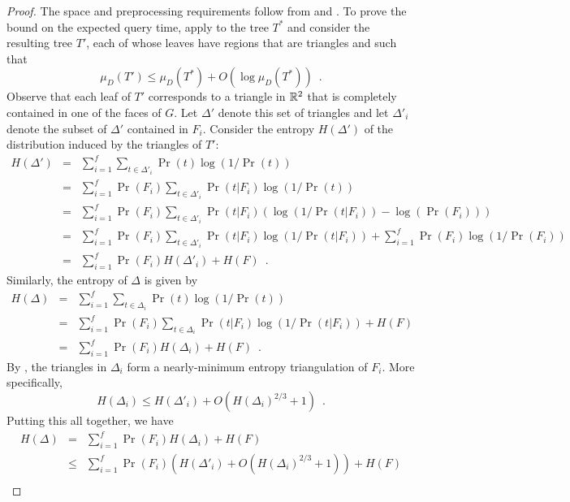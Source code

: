 \documentclass[lotsofwhite]{patmorin}
\begin{document}
\begin{proof}
The space and preprocessing requirements follow from
 and .
To prove the bound on the expected query time, apply
 to the tree $T^*$ and consider the resulting tree
$T'$, each of whose leaves have regions that are triangles and such
that
\[
     \mu_D(T') \le \mu_D(T^*) + O(\log \mu_D(T^*)) \enspace .
\]
Observe that each leaf of $T'$ corresponds to a triangle in $\mathbb{R}^2$
that is completely contained in one of the faces of $G$.  Let
$\Delta'$ denote this set of triangles and let $\Delta'_i$ denote the
subset of $\Delta'$ contained in $F_i$.
Consider the entropy $H(\Delta')$ of the distribution induced by the
triangles of $T'$:
\begin{eqnarray*}
   H(\Delta') 
     & = & \sum_{i=1}^f \sum_{t\in \Delta'_i}\Pr(t)\log(1/\Pr(t)) \\
     & = & \sum_{i=1}^f \Pr(F_i)\sum_{t\in \Delta'_i}
            \Pr(t|F_i)\log(1/\Pr(t)) \\
     & = & \sum_{i=1}^f \Pr(F_i)\sum_{t\in \Delta'_i}
            \Pr(t|F_i)
            \left(
              \log(1/\Pr(t|F_i))-\log(\Pr(F_i))
            \right) \\
     & = & \sum_{i=1}^f \Pr(F_i)\sum_{t\in \Delta'_i}
            \Pr(t|F_i)\log(1/\Pr(t|F_i)) 
          +
      \sum_{i=1}^f \Pr(F_i) \log(1/\Pr(F_i)) \\
     & = & \sum_{i=1}^f \Pr(F_i) H(\Delta'_i) + H(F) \enspace .
\end{eqnarray*}
Similarly, the entropy of $\Delta$ is given by 
\begin{eqnarray*}
   H(\Delta) 
     & = & \sum_{i=1}^f \sum_{t\in \Delta_i}\Pr(t)\log(1/\Pr(t)) \\
     & = & \sum_{i=1}^f \Pr(F_i)\sum_{t\in \Delta_i}
            \Pr(t|F_i)\log(1/\Pr(t|F_i)) 
          + H(F) \\
     & = & \sum_{i=1}^f \Pr(F_i) H(\Delta_i) + H(F) \enspace .
\end{eqnarray*}
By , the triangles in $\Delta_i$ form a
nearly-minimum entropy triangulation of $F_i$.  More specifically, 
\[  
   H(\Delta_i) \le H(\Delta'_i) + O(H(\Delta_i)^{2/3}+1)  \enspace .
\]
Putting this all together, we have
\begin{eqnarray*}
  H(\Delta) 
    &  =  & \sum_{i=1}^f\Pr(F_i) H(\Delta_i) + H(F) \\ 
    & \le & \sum_{i=1}^f\Pr(F_i) (H(\Delta'_i) + O(H(\Delta_i)^{2/3}+1)) + H(F) \\ 

\end{eqnarray*}
\end{proof}
\end{document}
